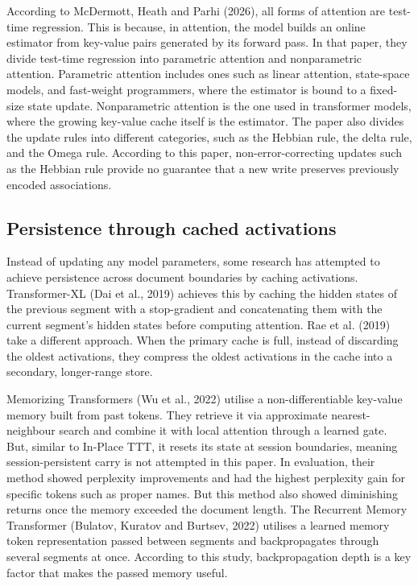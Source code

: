 \documentclass[12pt,a4paper]{article}
\begin{document}
According to McDermott, Heath and Parhi (2026), all forms of attention are test-time regression. This is because, in attention, the model builds an online estimator from key-value pairs generated by its forward pass. In that paper, they divide test-time regression into parametric attention and nonparametric attention. Parametric attention includes ones such as linear attention, state-space models, and fast-weight programmers, where the estimator is bound to a fixed-size state update. Nonparametric attention is the one used in transformer models, where the growing key-value cache itself is the estimator. The paper also divides the update rules into different categories, such as the Hebbian rule, the delta rule, and the Omega rule. According to this paper, non-error-correcting updates such as the Hebbian rule provide no guarantee that a new write preserves previously encoded associations.

\subsection*{Persistence through cached activations}

Instead of updating any model parameters, some research has attempted to achieve persistence across document boundaries by caching activations. Transformer-XL (Dai et al., 2019) achieves this by caching the hidden states of the previous segment with a stop-gradient and concatenating them with the current segment's hidden states before computing attention. Rae et al. (2019) take a different approach. When the primary cache is full, instead of discarding the oldest activations, they compress the oldest activations in the cache into a secondary, longer-range store.

Memorizing Transformers (Wu et al., 2022) utilise a non-differentiable key-value memory built from past tokens. They retrieve it via approximate nearest-neighbour search and combine it with local attention through a learned gate. But, similar to In-Place TTT, it resets its state at session boundaries, meaning session-persistent carry is not attempted in this paper. In evaluation, their method showed perplexity improvements and had the highest perplexity gain for specific tokens such as proper names. But this method also showed diminishing returns once the memory exceeded the document length. The Recurrent Memory Transformer (Bulatov, Kuratov and Burtsev, 2022) utilises a learned memory token representation passed between segments and backpropagates through several segments at once. According to this study, backpropagation depth is a key factor that makes the passed memory useful.
\end{document}
